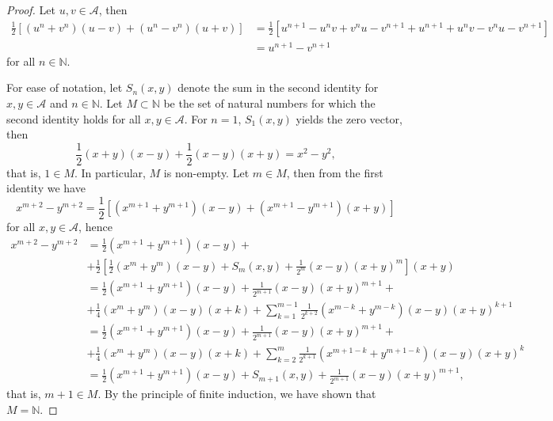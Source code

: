 \begin{proof}
    Let \(u,v \in \mathscr{A}\), then
    \begin{align*}
        \frac12\left[(u^n + v^n)(u - v) + (u^n - v^n)(u+v)\right] &= \frac12 \left[u^{n+1} - u^n v + v^n u - v^{n+1} + u^{n+1} + u^nv - v^nu -v^{n+1}\right]\\&= u^{n+1} - v^{n+1}
    \end{align*}
    for all \(n \in \mathbb{N}\).

    For ease of notation, let \(S_n(x,y)\) denote the sum in the second identity for \(x,y \in \mathscr{A}\) and \(n \in \mathbb{N}\).
    Let \(M \subset \mathbb{N}\) be the set of natural numbers for which the second identity holds for all \(x,y \in \mathscr{A}\). For \(n = 1\), \(S_1(x,y)\) yields the zero vector, then
    \begin{equation*}
        \frac12 (x + y)(x - y) + \frac12(x-y)(x+y) = x^2 - y^2,
    \end{equation*}
    that is, \(1 \in M\). In particular, \(M\) is non-empty. Let \(m \in M\), then from the first identity we have
    \begin{equation*}
        x^{m+2} - y^{m+2} = \frac{1}{2}\left[(x^{m+1} + y^{m+1})(x - y) + (x^{m+1} - y^{m+1})(x+y)\right]
    \end{equation*}
    for all \(x,y \in \mathscr{A}\), hence
    \begin{equation*}
        \begin{split}
            x^{m+2} - y^{m+2} &= \frac12 (x^{m+1} + y^{m+1})(x - y) + \\
                              &+\frac12\left[\frac12(x^{m} + y^{m})(x-y) + S_{m}(x,y) + \frac1{2^{m}}(x - y)(x+y)^{m} \right] (x+y)\\
                                &=\frac12 (x^{m+1} + y^{m+1})(x - y) + \frac{1}{2^{m+1}}(x-y)(x+y)^{m+1}+\\
                              &+\frac14 (x^{m} + y^{m})(x-y)(x+k) +  \sum_{k=1}^{m-1}\frac{1}{2^{k+2}}(x^{m-k} + y^{m-k})(x-y)(x+y)^{k+1}\\
                              &=\frac12 (x^{m+1} + y^{m+1})(x - y) + \frac{1}{2^{m+1}}(x-y)(x+y)^{m+1}+\\
                              &+\frac14 (x^{m} + y^{m})(x-y)(x+k) +  \sum_{k=2}^{m}\frac{1}{2^{k+1}}(x^{m+1-k} + y^{m+1-k})(x-y)(x+y)^{k}\\
                              &=\frac12 (x^{m+1} + y^{m+1})(x - y) + S_{m+1}(x,y) + \frac{1}{2^{m+1}}(x-y)(x+y)^{m+1},
        \end{split}
    \end{equation*}
    that is, \(m+1 \in M\). By the principle of finite induction, we have shown that \(M = \mathbb{N}\).
\end{proof}

